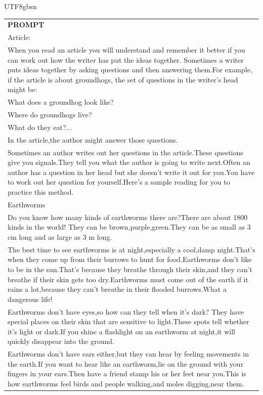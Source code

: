 \documentclass[11pt, a4paper, logo, copyright, nonumbering]{deepseek}
\begin{document}
\begin{CJK*}{UTF8}{gbsn}
\begin{table}[ht]
    \centering \small
\begin{tabular}{p{12cm}}
\toprule
\textbf{PROMPT}\\
Article:\\
When you read an article you will understand and remember it better if you can work out how the writer has put the ideas together. Sometimes a writer puts ideas together by asking questions and then answering them.For example, if the article is about groundhogs, the set of questions in the writer's head might be:\\
What does a groundhog look like?\\
Where do groundhogs live?\\
What do they eat?...\\
In the article,the author might answer those questions.\\
Sometimes an author writes out her questions in the article.These questions give you signals.They tell you what the author is going to write next.Often an author has a question in her head but she doesn't write it out for you.You have to work out her question for yourself.Here's a sample reading for you to practice this method.\\
Earthworms\\
Do you know how many kinds of earthworms there are?There are about 1800 kinds in the world! They can be brown,purple,green.They can be as small as 3 cm long and as large as 3 m long.\\
The best time to see earthworms is at night,especially a cool,damp night.That's when they come up from their burrows to hunt for food.Earthworms don't like to be in the sun.That's because they breathe through their skin,and they can't breathe if their skin gets too dry.Earthworms must come out of the earth if it rains a lot,because they can't breathe in their flooded burrows.What a dangerous life!\\
Earthworms don't have eyes,so how can they tell when it's dark? They have special places on their skin that are sensitive to light.These spots tell whether it's light or dark.If you shine a flashlight on an earthworm at night,it will quickly disappear into the ground.\\
Earthworms don't have ears either,but they can hear by feeling movements in the earth.If you want to hear like an earthworm,lie on the ground with your fingers in your ears.Then have a friend stamp his or her feet near you.This is how earthworms feel birds and people walking,and moles digging,near them.\\

\end{tabular}
\end{table}
\end{CJK*}
\end{document}
